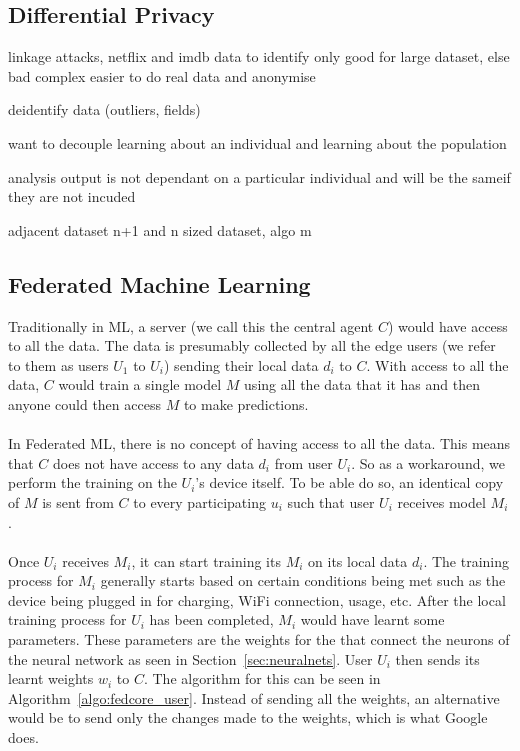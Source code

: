 \documentclass[12pt]{article}
\begin{document}
\subsection{Differential Privacy}
linkage attacks, netflix and imdb data to identify
only good for large dataset, else bad 
	complex
	easier to do real data and anonymise 

deidentify data (outliers, fields)
 	
want to decouple learning about an individual and learning about the population

analysis output is not dependant on a particular individual and will be the sameif they are not incuded

adjacent dataset
	n+1 and n sized dataset, algo m
\subsection{Federated Machine Learning}\label{subsec:fedml}
Traditionally in ML, a server (we call this the central agent $C$) would have access to all the data. The data is presumably collected by all the edge users (we refer to them as users $U_1$ to $U_i$) sending their local data $d_i$ to $C$. With access to all the data, $C$ would train a single model $M$ using all the data that it has and then anyone could then access $M$ to make predictions. 
\\\\
In Federated ML, there is no concept of having access to all the data. This means that $C$ does not have access to any data $d_i$ from user $U_i$. So as a workaround, we perform the training on the $U_i$'s device itself. To be able do so, an identical copy of $M$ is sent from $C$ to every participating $u_i$ such that user $U_i$ receives model $M_i$. 
\\\\
Once $U_i$ receives $M_i$, it can start training its $M_i$ on its local data $d_i$. The training process for $M_i$ generally starts based on certain conditions being met such as the device being plugged in for charging, WiFi connection, usage, etc. After the local training process for $U_i$ has been completed, $M_i$ would have learnt some parameters. These parameters are the weights for the that connect the neurons of the neural network as seen in Section~\ref{sec:neuralnets}. User $U_i$ then sends its learnt weights $w_i$ to $C$. The algorithm for this can be seen in Algorithm~\ref{algo:fedcore_user}. Instead of sending all the weights, an alternative would be to send only the changes made to the weights, which is what Google does.
\end{document}
